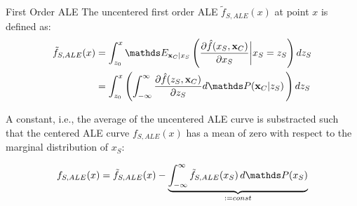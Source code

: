 \documentclass[11pt,compress,t,notes=noshow, xcolor=table]{beamer}
\begin{document}

\begin{vbframe}{First Order ALE}
The uncentered first order ALE $\tilde{f}_{S, ALE}(x)$ at point $x$ is defined as:
$$
\begin{aligned}
\tilde{f}_{S, ALE}(x) &= \int_{z_{0}}^{x} \E_{\xv_C \vert x_S} \left(\frac{\partial \fh(x_S, \xv_C)}{\partial x_S} \bigg \vert x_S = z_S \right) dz_S \\
&= \int_{z_{0}}^{x} \left( \int_{-\infty}^{\infty}  \frac{\partial \fh(z_S, \xv_C)}{\partial z_S} d\P(\xv_C | z_S) \,   \right) dz_S
\end{aligned}
$$

A constant, i.e., the average of the uncentered ALE curve is substracted such that the centered ALE curve $f_{S, ALE}(x)$ has a mean of zero with respect to the marginal distribution of $x_S$:

$$
\begin{aligned}
f_{S, ALE}(x) = \tilde{f}_{S, ALE}(x) - \underbrace{\int_{-\infty}^{\infty}\tilde{f}_{S, ALE}(x_S) \, d\P(x_S)}_{:= const}
\end{aligned}
$$

\end{vbframe}

\end{document}
